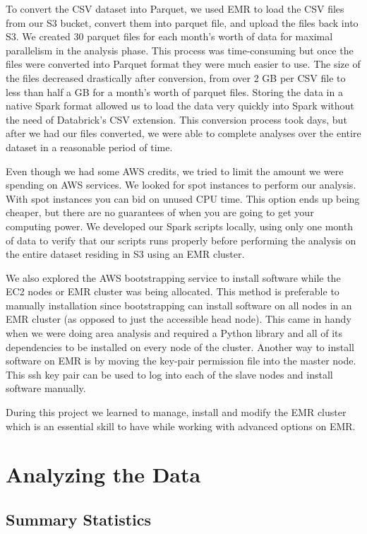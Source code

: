 \documentclass[11pt]{article} %
\begin{document}
To convert the CSV dataset into Parquet, we used EMR to load the CSV files from our S3 bucket, convert them into parquet file, and upload the files back into S3. We created 30 parquet files for each month’s worth of data for maximal parallelism in the analysis phase. This process was time-consuming but once the files were converted into Parquet format they were much easier to use. The size of the files decreased drastically after conversion, from over 2 GB per CSV file to less than half a GB for a month’s worth of parquet files. Storing the data in a native Spark format allowed us to load the data very quickly into Spark without the need of Databrick’s CSV extension. This conversion process took days, but after we had our files converted, we were able to complete analyses over the entire dataset in a reasonable period of time.

Even though we had some AWS credits, we tried to limit the amount we were spending on AWS services. We looked for spot instances to perform our analysis. With spot instances you can bid on unused CPU time. This option ends up being cheaper, but there are no guarantees of when you are going to get your computing power. We developed our Spark scripts locally, using only one month of data to verify that our scripts runs properly before performing the analysis on the entire dataset residing in S3 using an EMR cluster.

We also explored the AWS bootstrapping service to install software while the EC2 nodes or EMR cluster was being allocated. This method is preferable to manually installation since bootstrapping can install software on all nodes in an EMR cluster (as opposed to just the accessible head node). This came in handy when we were doing area analysis and required a Python library and all of its dependencies to be installed on every node of the cluster. Another way to install software on EMR is by moving the key-pair permission file into the master node. This ssh key pair can be used to log into each of the slave nodes and install software manually. 

During this project we learned to manage, install and modify the EMR cluster which is an essential skill to have while working with advanced options on EMR.


\section{Analyzing the Data}

\subsection{Summary Statistics}
\end{document}
